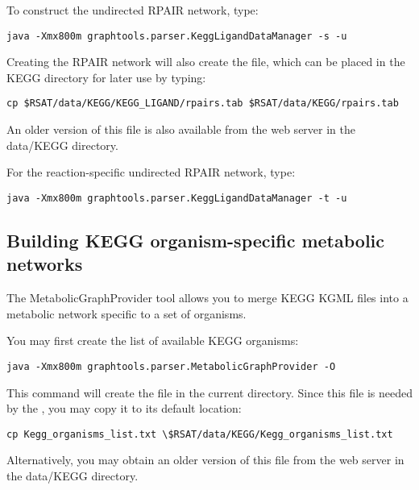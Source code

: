 \label{RPAIR}
To construct the undirected RPAIR network, type:

\begin{lstlisting}
java -Xmx800m graphtools.parser.KeggLigandDataManager -s -u
\end{lstlisting}

Creating the RPAIR network will also create the  file, which
can be placed in the KEGG directory for later use by typing:

\begin{lstlisting}
cp $RSAT/data/KEGG/KEGG_LIGAND/rpairs.tab $RSAT/data/KEGG/rpairs.tab
\end{lstlisting}

An older version of this file is also available from the \neat web server
in the data/KEGG directory.

For the reaction-specific undirected RPAIR network, type:

\begin{lstlisting}
java -Xmx800m graphtools.parser.KeggLigandDataManager -t -u
\end{lstlisting}

\subsection{Building KEGG organism-specific metabolic networks}

The MetabolicGraphProvider tool allows you to merge KEGG KGML files into
a metabolic network specific to a set of organisms. 

You may first create the list of available KEGG organisms:

\begin{lstlisting}
java -Xmx800m graphtools.parser.MetabolicGraphProvider -O
\end{lstlisting}

This command will create the file  in the
current directory. Since this file is needed by the
, you may copy it to its default location:

\begin{lstlisting}
cp Kegg_organisms_list.txt \$RSAT/data/KEGG/Kegg_organisms_list.txt
\end{lstlisting}

Alternatively, you may obtain an older version of this file from the \neat web
server in the data/KEGG directory. 

